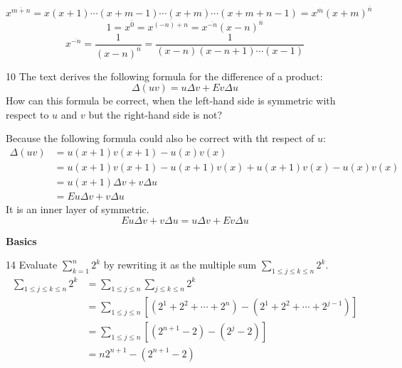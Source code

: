 \documentclass[a4paper,12pt]{article}
\makeatletter
\newtheorem*{solution}{Solution}
\theoremstyle{definition}
\renewenvironment{solution}[1][Solution] {\par\pushQED{\qed}\normalfont\topsep6\p@\@plus6\p@\relax\trivlist\item[\hskip\labelsep\bfseries#1\@addpunct{.}]\ignorespaces}{\popQED\endtrivlist\@endpefalse} \makeatother
\newenvironment{problems}{\begin{list}{}{\renewcommand{\makelabel}[1]{\textbf{##1}\hfil}}}{\end{list}}
\makeatother
\begin{document}
\begin{problems}
\begin{solution}
        \begin{equation*}
            x^{\overline{m+n}} = x(x+1)\cdots(x+m-1)\cdots(x+m)\cdots(x+m+n-1) = x^{\overline{m}}(x+m)^{\overline{n}}
        \end{equation*}
        \begin{equation*}
            1 = x^{\overline{0}}= x^{\overline{(-n)+n}} = x^{\overline{-n}}(x-n)^{\overline{n}}
        \end{equation*}
        \begin{equation*}
            x^{\overline{-n}} = \frac{1}{(x-n)^{\overline{n}}} = \frac{1}{(x-n)(x-n+1)\cdots(x-1)}
        \end{equation*}
    \end{solution} 
    \item[10] The text derives the following formula for the difference of a product:
    \begin{equation*}
        \Delta(uv) = u\Delta v + Ev\Delta u
    \end{equation*}
    How can this formula be correct, when the left-hand side is symmetric with respect to $u$ and $v$ but the right-hand side is not?
    \begin{solution}
        Because the following formula could also be correct with tht respect of $u$:
        \begin{align*}
            \Delta(uv) &= u(x+1)v(x+1) - u(x)v(x)\\
            &=u(x+1)v(x+1) - u(x+1)v(x) + u(x+1)v(x) - u(x)v(x)\\
            &=u(x+1)\Delta v + v\Delta u\\
            &=Eu\Delta v + v\Delta u
        \end{align*}
        It is an inner layer of symmetric.
        \begin{equation*}
            Eu\Delta v + v\Delta u = u\Delta v + Ev\Delta u
        \end{equation*}
    \end{solution}
\end{problems}

\noindent\textbf{Basics}

\begin{problems}
    \item[14] Evaluate $\sum_{k=1}^n 2^k$ by rewriting it as the multiple sum $\sum_{1\leq j \leq k\leq n}2^k$.
    \begin{align*}
        \sum_{1\leq j \leq k\leq n}2^k &= \sum_{1\leq j\leq n}\sum_{j\leq k\leq n}2^k \\&= \sum_{1\leq j\leq n}\left[(2^1+2^2+\cdots+2^n) - (2^1+2^2+\cdots +2^{j-1})\right] \\&= \sum_{1\leq j\leq n}\left[(2^{n+1}-2)-(2^j-2)\right] \\&= n2^{n+1}-(2^{n+1}-2)
    \end{align*} 
\end{problems}
\end{document}
